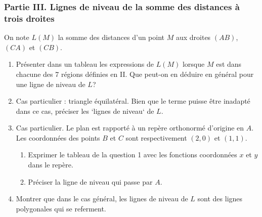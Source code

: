 \subsubsection*{Partie III. Lignes de niveau de la somme des distances à trois droites}
On note $L(M)$ la somme des distances d'un point $M$ aux droites $(AB)$, $(CA)$ et $(CB)$.
\begin{enumerate}
\item Présenter dans un tableau les expressions de $L(M)$ lorsque $M$ est dans chacune des 7 régions définies en II. Que peut-on en déduire en général pour une ligne de niveau de $L$?
\item Cas particulier : triangle équilatéral.\newline
Bien que le terme puisse être inadapté dans ce cas, préciser les `lignes de niveau` de $L$.
\item Cas particulier.\newline
Le plan est rapporté à un repère orthonormé d'origine en $A$. Les coordonnées des points $B$ et $C$ sont respectivement $(2,0)$ et $(1,1)$.
\begin{enumerate}
\item Exprimer le tableau de la question 1 avec les fonctions coordonnées $x$ et $y$ dans le repère.
\item Préciser la ligne de niveau qui passe par $A$.
\end{enumerate}
\item Montrer que dans le cas général, les lignes de niveau de $L$ sont des lignes polygonales qui se referment. 
\end{enumerate}